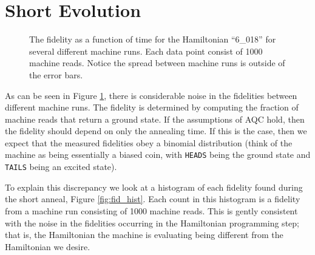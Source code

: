 \documentclass[12pt]{dalthesis}
\begin{document}
\section{Short Evolution}
\begin{figure}
	\caption[Short Time Fidelities]{The fidelity as a function of time for the Hamiltonian ``6\_018'' for several different machine runs.  Each data point consist of 1000 machine reads.  Notice the spread between machine runs is outside of the error bars.}
	\label{fig:short_fidelity}
\end{figure}
As can be seen in Figure \ref{fig:short_fidelity}, there is considerable noise in the fidelities between different machine runs.  The fidelity is determined by computing the fraction of machine reads that return a ground state.  If the assumptions of AQC hold, then the fidelity should depend on only the annealing time.  If this is the case, then we expect that the measured fidelities obey a binomial distribution (think of the machine as being essentially a biased coin, with \texttt{HEADS} being the ground state and \texttt{TAILS} being an excited state).  

To explain this discrepancy we look at a histogram of each fidelity found during the short anneal, Figure \ref{fig:fid_hist}.  Each count in this histogram is a fidelity from a machine run consisting of 1000 machine reads.  This is gently consistent with the noise in the fidelities occurring in the Hamiltonian programming step; that is, the Hamiltonian the machine is evaluating being different from the Hamiltonian we desire.
\end{document}

